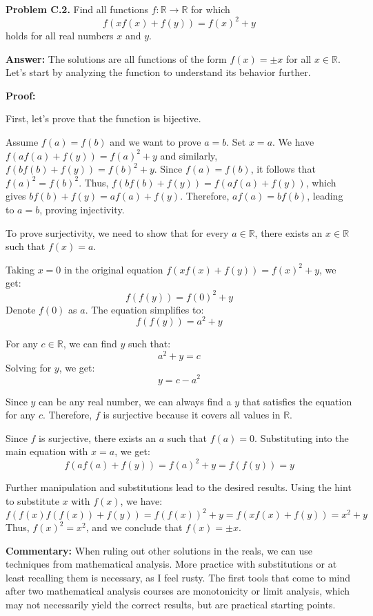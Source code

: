\documentclass{article}
\begin{document}
\textbf{Problem C.2.} Find all functions \( f : \mathbb{R} \to \mathbb{R} \) for which
\[
f(xf(x) + f(y)) = f(x)^2 + y
\]
holds for all real numbers \( x \) and \( y \).

\textbf{Answer:} The solutions are all functions of the form \( f(x) = \pm x \) for all \( x \in \mathbb{R} \). Let's start by analyzing the function to understand its behavior further.

\textbf{Proof:} 

First, let's prove that the function is bijective. 

Assume \( f(a) = f(b) \) and we want to prove \( a = b \). Set \( x = a \). 
We have \( f(af(a) + f(y)) = f(a)^2 + y \) and similarly, \( f(bf(b) + f(y)) = f(b)^2 + y \). 
Since \( f(a) = f(b) \), it follows that \( f(a)^2 = f(b)^2 \). Thus, \( f(bf(b) + f(y)) = f(af(a) + f(y)) \), which gives \( bf(b) + f(y) = af(a) + f(y) \). Therefore, \( af(a) = bf(b) \), leading to \( a = b \), proving injectivity.

To prove surjectivity, we need to show that for every \( a \in \mathbb{R} \), there exists an \( x \in \mathbb{R} \) such that \( f(x) = a \).

Taking \( x = 0 \) in the original equation \( f(xf(x) + f(y)) = f(x)^2 + y \), we get:  
\[
f(f(y)) = f(0)^2 + y
\]  
Denote \( f(0) \) as \( a \). The equation simplifies to:  
\[
f(f(y)) = a^2 + y
\]

For any \( c \in \mathbb{R} \), we can find \( y \) such that:  
\[
a^2 + y = c
\]  
Solving for \( y \), we get:  
\[
y = c - a^2
\]

Since \( y \) can be any real number, we can always find a \( y \) that satisfies the equation for any \( c \). Therefore, \( f \) is surjective because it covers all values in \(\mathbb{R}\).

Since \( f \) is surjective, there exists an \( a \) such that \( f(a) = 0 \). Substituting into the main equation with \( x = a \), we get:
\[
f(af(a) + f(y)) = f(a)^2 + y = f(f(y)) = y
\]

Further manipulation and substitutions lead to the desired results. Using the hint to substitute \( x \) with \( f(x) \), we have:  
\[
f(f(x)f(f(x)) + f(y)) = f(f(x))^2 + y = f(xf(x) + f(y)) = x^2 + y
\]  
Thus, \( f(x)^2 = x^2 \), and we conclude that \( f(x) = \pm x \).

\textbf{Commentary:} When ruling out other solutions in the reals, we can use techniques from mathematical analysis. More practice with substitutions or at least recalling them is necessary, as I feel rusty. The first tools that come to mind after two mathematical analysis courses are monotonicity or limit analysis, which may not necessarily yield the correct results, but are practical starting points.
\end{document}
